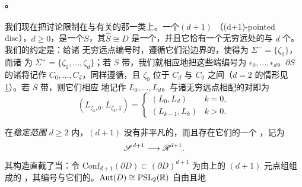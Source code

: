 \paragraph{\trPointedDisc。}\label{sub:pointed-discs}
我们现在把讨论限制在与\trFukayaCategory{}有关的那一类\trSurface{}上。一个\textbf{$(d+1)$ \trPointedDisc}%
（(d+1)-pointed disc），$d\ge 0$，是一个\trPointedBoundary\trRiemann\trSurface{}$S$，其\trCompactification{}$\hat{S}\cong D$
是一个\trDisk，并且它恰有一个无穷远处的\trIncomingPoint{}与 $d$ 个\trOutgoingPoint。我们的约定是：给诸
无穷远点编号时，遵循它们沿\trDisk{}边界的\trCyclicOrder，使得\trIncomingPoint{}为 $\Sigma^-=\{\zeta_0\}$，而诸%
\trOutgoingPoint{}为 $\Sigma^+=\{\zeta_1,\ldots,\zeta_d\}$；若 $S$ 带\trStriplikeEnd，我们就相应地把这些端编号为
$\epsilon_0,\ldots,\epsilon_d$。$\partial S$ 的诸\trConnectedComponent{}将记作 $C_0,\ldots,C_d$，同样遵循\trCyclicOrder，且
$\zeta_0$ 位于 $C_d$ 与 $C_0$ 之间（$d=2$ 的情形见\cref{fig:pointed-disc}）。若 $S$ 带\trLagrange\trLabel，则它们相应
地记作 $L_0,\ldots,L_d$。与诸无穷远点相配的\trLagrange\trSubmanifold{}对即为
\begin{equation}\label{eq:lagrangian-pairs}
(L_{\zeta_k,0},L_{\zeta_k,1})=
\begin{cases}
(L_0,L_d) & k=0,\\
(L_{k-1},L_k) & k>0.
\end{cases}
\end{equation}
\begin{figure}[htbp]
\centering
{}
\caption{}\label{fig:pointed-disc}
\end{figure}
在\emph{稳定范围} $d\ge 2$ 内，$(d+1)$ \trPointedDisc{}没有非平凡的\trAutomorphism，而且存在它们的一个%
\trUniversal\trFamily，记为
\begin{equation}\label{eq:universal-family}
\mathscr{S}^{d+1}\longrightarrow\mathscr{R}^{d+1}.
\end{equation}
其构造直截了当：令 $\mathrm{Conf}_{d+1}(\partial D)\subset(\partial D)^{d+1}$ 为由\trCircle{}上的 $(d+1)$ 元点组组成的%
\trConfigurationSpace，其编号与它们的\trCyclicOrder\trCompatible。$\mathrm{Aut}(D)\cong\mathrm{PSL}_2(\mathbb{R})$ 自由且\trProper{}地
